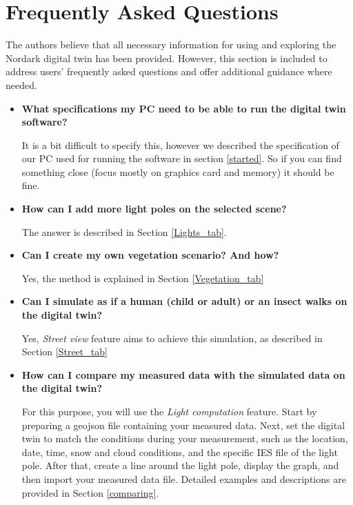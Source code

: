 \section{Frequently Asked Questions}

The authors believe that all necessary information for using and exploring the Nordark digital twin has been provided. However, this section is included to address users' frequently asked questions and offer additional guidance where needed.

\begin{itemize}
    \item \textbf{What specifications my PC need to be able to run the digital twin software?}

    It is a bit difficult to specify this, however we described the specification of our PC used for running the software in section \ref{started}. So if you can find something close (focus mostly on graphics card and memory) it should be fine.

    \item \textbf{How can I add more light poles on the selected scene?}
    
    The answer is described in Section \ref{Lights_tab}.
    
    \item \textbf{Can I create my own vegetation scenario? And how?}
    
    Yes, the method is explained in Section \ref{Vegetation_tab}
    
    \item \textbf{Can I simulate as if a human (child or adult) or an insect walks on the digital twin?}
    
    Yes, \textit{Street view} feature aims to achieve this simulation, as described in Section \ref{Street_tab}
    
    \item \textbf{How can I compare my measured data with the simulated data on the digital twin?}
    
    For this purpose, you will use the \textit{Light computation} feature. Start by preparing a geojson file containing your measured data. Next, set the digital twin to match the conditions during your measurement, such as the location, date, time, snow and cloud conditions, and the specific IES file of the light pole. After that, create a line around the light pole, display the graph, and then import your measured data file. Detailed examples and descriptions are provided in Section \ref{comparing}.
    

\end{itemize}
